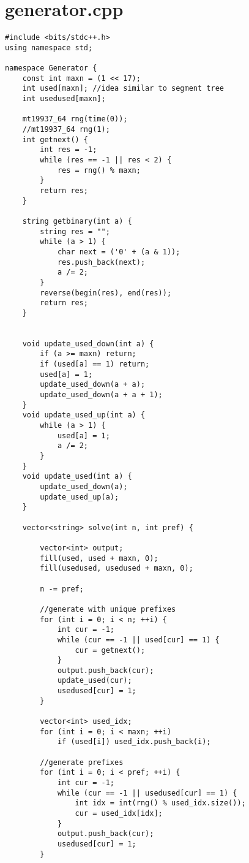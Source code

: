 \documentclass[a4paper,12pt]{report}
\begin{document}
\section{generator.cpp}
\begin{lstlisting}
#include <bits/stdc++.h>
using namespace std;

namespace Generator {
    const int maxn = (1 << 17);
    int used[maxn]; //idea similar to segment tree
    int usedused[maxn];

    mt19937_64 rng(time(0));
    //mt19937_64 rng(1);
    int getnext() {
        int res = -1;
        while (res == -1 || res < 2) {
            res = rng() % maxn;
        }
        return res;
    }

    string getbinary(int a) {
        string res = "";
        while (a > 1) {
            char next = ('0' + (a & 1));
            res.push_back(next);
            a /= 2;
        }
        reverse(begin(res), end(res));
        return res;
    }


    void update_used_down(int a) {
        if (a >= maxn) return;
        if (used[a] == 1) return;
        used[a] = 1;
        update_used_down(a + a);
        update_used_down(a + a + 1);
    }
    void update_used_up(int a) {
        while (a > 1) {
            used[a] = 1;
            a /= 2;
        }
    }
    void update_used(int a) {
        update_used_down(a);
        update_used_up(a);
    }

    vector<string> solve(int n, int pref) {

        vector<int> output;
        fill(used, used + maxn, 0);
        fill(usedused, usedused + maxn, 0);

        n -= pref;

        //generate with unique prefixes
        for (int i = 0; i < n; ++i) {
            int cur = -1;
            while (cur == -1 || used[cur] == 1) {
                cur = getnext();
            }
            output.push_back(cur);
            update_used(cur);
            usedused[cur] = 1;
        }

        vector<int> used_idx;
        for (int i = 0; i < maxn; ++i)
            if (used[i]) used_idx.push_back(i);

        //generate prefixes
        for (int i = 0; i < pref; ++i) {
            int cur = -1;
            while (cur == -1 || usedused[cur] == 1) {
                int idx = int(rng() % used_idx.size());
                cur = used_idx[idx];
            }
            output.push_back(cur);
            usedused[cur] = 1;
        }


\end{lstlisting}
\end{document}
